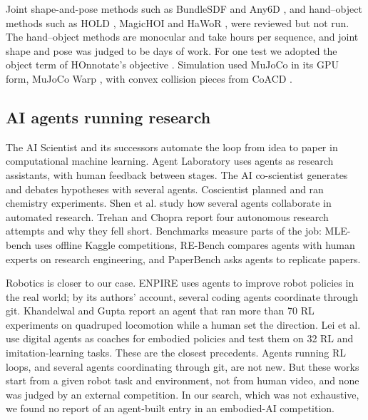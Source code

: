\documentclass[11pt]{article}
\begin{document}
Joint shape-and-pose methods such as BundleSDF \cite{r30} and Any6D \cite{r31}, and hand–object methods such as HOLD \cite{r32}, MagicHOI \cite{r33} and HaWoR \cite{r34}, were reviewed but not run. The hand–object methods are monocular and take hours per sequence, and joint shape and pose was judged to be days of work. For one test we adopted the object term of HOnnotate's objective \cite{r35}. Simulation used MuJoCo \cite{r36} in its GPU form, MuJoCo Warp \cite{r37}, with convex collision pieces from CoACD \cite{r38}.

\subsection{AI agents running research}
The AI Scientist \cite{r9} and its successors \cite{r39,r40} automate the loop from idea to paper in computational machine learning. Agent Laboratory \cite{r10} uses agents as research assistants, with human feedback between stages. The AI co-scientist \cite{r41} generates and debates hypotheses with several agents. Coscientist \cite{r42} planned and ran chemistry experiments. Shen et al. \cite{r43} study how several agents collaborate in automated research. Trehan and Chopra \cite{r44} report four autonomous research attempts and why they fell short. Benchmarks measure parts of the job: MLE-bench \cite{r45} uses offline Kaggle competitions, RE-Bench \cite{r46} compares agents with human experts on research engineering, and PaperBench \cite{r47} asks agents to replicate papers.

Robotics is closer to our case. ENPIRE \cite{r11} uses agents to improve robot policies in the real world; by its authors' account, several coding agents coordinate through git. Khandelwal and Gupta \cite{r12} report an agent that ran more than 70 RL experiments on quadruped locomotion while a human set the direction. Lei et al. \cite{r48} use digital agents as coaches for embodied policies and test them on 32 RL and imitation-learning tasks. These are the closest precedents. Agents running RL loops, and several agents coordinating through git, are not new. But these works start from a given robot task and environment, not from human video, and none was judged by an external competition. In our search, which was not exhaustive, we found no report of an agent-built entry in an embodied-AI competition.
\end{document}

